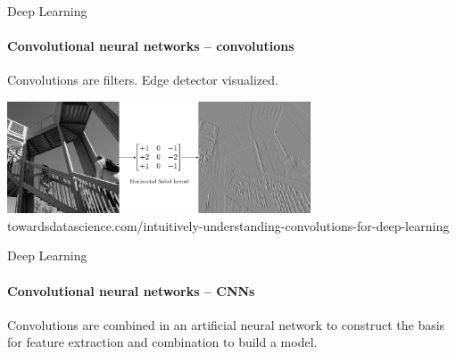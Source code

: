\documentclass{beamer}
\begin{document}
\begin{darkframes}
        \begin{frame}{Deep Learning}
      \framesubtitle{Convolutional neural networks -- convolutions}
      \begin{block}
      {\small{Convolutions are filters.}}
      Edge detector visualized. 
      \end{block}
      \begin{center}
      \includegraphics[width=9cm]{sobel_kernel.png}  \\
      \tiny{towardsdatascience.com/intuitively-understanding-convolutions-for-deep-learning}
      \end{center}
    \end{frame}
    
    \begin{frame}{Deep Learning}
      \framesubtitle{Convolutional neural networks -- CNNs}
      \begin{block}
      {\small{Convolutions are combined in an artificial neural network to construct the basis for feature extraction and combination to build a model.}}
      \end{block}
      
        \def\layersep{2.5cm}
        
\end{frame}
\end{darkframes}
\end{document}
